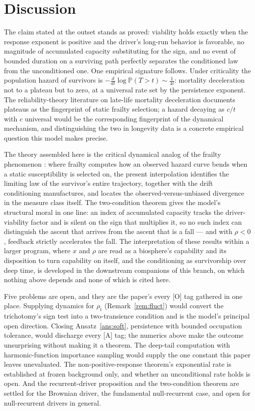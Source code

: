 \documentclass[11pt]{article}
\theoremstyle{definition}
\theoremstyle{remark}
\newcommand{\PP}{\mathbb{P}}
\begin{document}
\section{Discussion}\label{sec:discussion}

The claim stated at the outset stands as proved: viability holds
exactly when the response exponent is positive and the driver's
long-run behavior is favorable, no magnitude of accumulated capacity
substituting for the sign, and no event of bounded duration on a surviving
path perfectly separates the conditioned law from the unconditioned
one. One
empirical signature follows. Under criticality the
population hazard of survivors is $-\frac{d}{dt}\log\PP(T>t)\sim
\frac{1}{4t}$: mortality deceleration not to a plateau but to zero, at
a universal rate set by the persistence exponent. The
reliability-theory literature on late-life mortality deceleration
\cite{GG01} documents plateaus as the fingerprint of static frailty
selection; a hazard decaying as $c/t$ with $c$ universal would be the
corresponding fingerprint of the dynamical mechanism, and
distinguishing the two in longevity data is a concrete empirical
question this model makes precise.

The theory assembled here is the critical dynamical analog of the
frailty phenomenon \cite{VMS79,VY85}: where frailty computes how an
observed hazard curve bends when a static susceptibility is selected
on, the present interpolation identifies the limiting law of the
survivor's entire trajectory, together with the drift conditioning
manufactures, and locates the observed-versus-unbiased divergence in
the measure class itself. The two-condition theorem gives the model's
structural moral in one line: an index of accumulated capacity tracks
the driver-viability factor and is silent on the sign that multiplies it, so
no such index can distinguish the ascent that arrives from the ascent
that is a fall --- and with $\rho<0$, feedback strictly accelerates
the fall. The interpretation of these results within a larger program, where $x$ and $\rho$ are read as a biosphere's capability and its
disposition to turn capability on itself, and the conditioning as
survivorship over deep time, is developed in the downstream companions of this branch, on which
nothing above depends and none of which is cited here.

Five problems are open, and they are the paper's every [O] tag
gathered in one place. Supplying dynamics for $\rho_t$
(Remark~\ref{rem:fluct}) would convert the trichotomy's sign test into
a two-transience condition and is the model's principal open
direction. Closing Ansatz~\ref{ans:soft}, persistence with bounded
occupation tolerance, would discharge every [A] tag; the numerics
above make the outcome unsurprising without making it a theorem. The
deep-tail computation with harmonic-function importance sampling
would supply the one constant this paper leaves unevaluated. The
non-positive-response theorem's exponential rate is established at
frozen background only, and whether an unconditional rate holds is
open. And the recurrent-driver proposition and the two-condition
theorem are settled for the Brownian driver, the fundamental
null-recurrent case, and open for null-recurrent drivers in
general.
\end{document}
